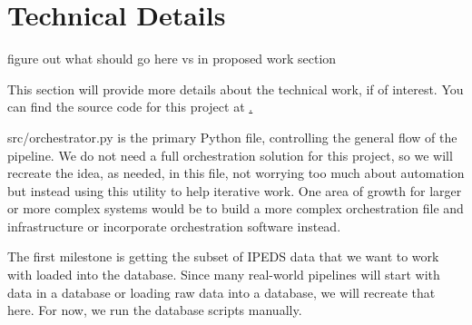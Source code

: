\documentclass[sigconf, authorversion, nonacm]{acmart}
\begin{document}
\appendix

\section{Technical Details}





    figure out what should go here vs in proposed work section






    This section will provide more details about the technical work, if of interest. You can find the source code for this project at \href{https://github.com/jhleakakos/msds-data-mining-project}.

    src/orchestrator.py is the primary Python file, controlling the general flow of the pipeline. We do not need a full orchestration solution for this project, so we will recreate the idea, as needed, in this file, not worrying too much about automation but instead using this utility to help iterative work. One area of growth for larger or more complex systems would be to build a more complex orchestration file and infrastructure or incorporate orchestration software instead.

    The first milestone is getting the subset of IPEDS data that we want to work with loaded into the database. Since many real-world pipelines will start with data in a database or loading raw data into a database, we will recreate that here. For now, we run the database scripts manually.
\end{document}
